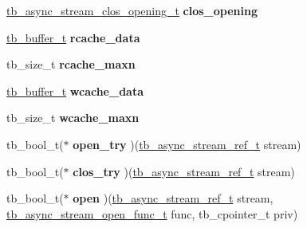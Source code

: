 \begin{DoxyCompactItemize}
{{{\begin{tabbing}
{\end{tabbing}\item 
\hypertarget{structtb__async__stream__impl__t_ac4d931bdcffb1b434216df3ee55c4c52}{\hyperlink{structtb__async__stream__clos__opening__t}{tb\-\_\-async\-\_\-stream\-\_\-clos\-\_\-opening\-\_\-t} {\bfseries clos\-\_\-opening}}\label{structtb__async__stream__impl__t_ac4d931bdcffb1b434216df3ee55c4c52}

\item 
\hypertarget{structtb__async__stream__impl__t_a8fa37bf313119e8bde5ad4c204a68fd4}{\hyperlink{structtb__buffer__t}{tb\-\_\-buffer\-\_\-t} {\bfseries rcache\-\_\-data}}\label{structtb__async__stream__impl__t_a8fa37bf313119e8bde5ad4c204a68fd4}

\item 
\hypertarget{structtb__async__stream__impl__t_ad9869425024a1e654c37d091c0324f4e}{tb\-\_\-size\-\_\-t {\bfseries rcache\-\_\-maxn}}\label{structtb__async__stream__impl__t_ad9869425024a1e654c37d091c0324f4e}

\item 
\hypertarget{structtb__async__stream__impl__t_ab1171e1822dbf8aa2e1e71da158dd629}{\hyperlink{structtb__buffer__t}{tb\-\_\-buffer\-\_\-t} {\bfseries wcache\-\_\-data}}\label{structtb__async__stream__impl__t_ab1171e1822dbf8aa2e1e71da158dd629}

\item 
\hypertarget{structtb__async__stream__impl__t_a5fa5283e665710c8b11d799d83546115}{tb\-\_\-size\-\_\-t {\bfseries wcache\-\_\-maxn}}\label{structtb__async__stream__impl__t_a5fa5283e665710c8b11d799d83546115}

\item 
\hypertarget{structtb__async__stream__impl__t_ab112b834f79b4169ee7715de89b5e8de}{tb\-\_\-bool\-\_\-t($\ast$ {\bfseries open\-\_\-try} )(\hyperlink{structtb__async__stream__ref__t}{tb\-\_\-async\-\_\-stream\-\_\-ref\-\_\-t} stream)}\label{structtb__async__stream__impl__t_ab112b834f79b4169ee7715de89b5e8de}

\item 
\hypertarget{structtb__async__stream__impl__t_aec4831b82b29357057067e6a3cd0ac27}{tb\-\_\-bool\-\_\-t($\ast$ {\bfseries clos\-\_\-try} )(\hyperlink{structtb__async__stream__ref__t}{tb\-\_\-async\-\_\-stream\-\_\-ref\-\_\-t} stream)}\label{structtb__async__stream__impl__t_aec4831b82b29357057067e6a3cd0ac27}

\item 
\hypertarget{structtb__async__stream__impl__t_afe8745064ec4ac892dfb9c3b3a4a98a8}{tb\-\_\-bool\-\_\-t($\ast$ {\bfseries open} )(\hyperlink{structtb__async__stream__ref__t}{tb\-\_\-async\-\_\-stream\-\_\-ref\-\_\-t} stream, \hyperlink{async__stream_8h_a04a858fc06433335236db4bddcdfc1cb}{tb\-\_\-async\-\_\-stream\-\_\-open\-\_\-func\-\_\-t} func, tb\-\_\-cpointer\-\_\-t priv)}\label{structtb__async__stream__impl__t_afe8745064ec4ac892dfb9c3b3a4a98a8}

}}}
\end{DoxyCompactItemize}
